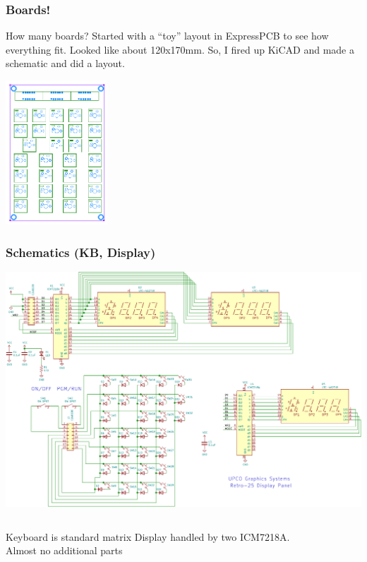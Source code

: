 \documentclass{beamer}
\newcommand{\tred}[1]{\textcolor{my-red}{#1}}
\newcommand{\tblue}[1]{\textcolor{my-blue}{#1}}
\begin{document}
\begin{frame}
  \frametitle{Boards!}

  \scriptsize
  How many boards?  Started with a ``toy'' layout in ExpressPCB to
  see how everything fit.  Looked like about 120x170mm.  So, I fired
  up KiCAD and made a schematic and did a layout.

  \includegraphics[width=1.5in]{figs/sample_epcb.png}

\end{frame}


\begin{frame}
  \frametitle{Schematics (KB, Display)}  

  \vskip -0.2in
  \includegraphics[width=\textwidth]{figs/led-display-crop.pdf}

  \scriptsize
  \begin{columns}
  \tblue{Keyboard is standard matrix}
  \tred{Display handled by two ICM7218A.  \\ Almost no additional parts}
  \end{columns}
\end{frame}
\end{document}
